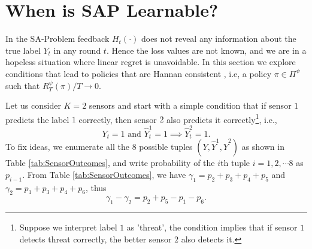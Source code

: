\documentclass{article}
\begin{document}
\section{When is SAP Learnable?}
In the SA-Problem feedback $H_t(\cdot)$ does not reveal any information about the true label $Y_t$ in any round $t$. Hence the loss values are not known, and we are in a hopeless situation where linear regret is unavoidable. In this section we explore conditions that lead to policies that are Hannan consistent \cite{Hannan1957_HannanConsistency_Hannan}, i.e, a policy $\pi\in \Pi^\psi$ such that $R_T^\psi (\pi)/T \rightarrow 0$.

Let us consider $K=2$ sensors and start with a simple condition that if sensor $1$ predicts the label $1$ correctly, then sensor $2$ also predicts it correctly\footnote{Suppose we interpret label $1$ as 'threat', the condition implies that if sensor $1$ detects threat correctly, the better sensor $2$ also detects it. }, i.e.,
\begin{equation}
\label{eqn:PathDominace1} 
Y_t=1 \mbox{ and } \hat{Y}_t^1=1 \implies \hat{Y}^2_t=1. 
\end{equation}
To fix ideas, we enumerate all the $8$ possible tuples $(Y, \hat{Y}^1, \hat{Y}^2)$ as shown in Table \ref{tab:SensorOutcomes}, and write probability of the $i$th tuple $i=1,2,\cdots 8$ as $p_{i-1}$.  From Table \ref{tab:SensorOutcomes}, we have  $\gamma_1=p_2+p_3+p_4+p_5$ and $\gamma_2=p_1+p_3+p_4+p_6$, thus
\begin{equation}
	\gamma_1-\gamma_2 = p_2+p_5-p_1-p_6.
\end{equation}
\end{document}
